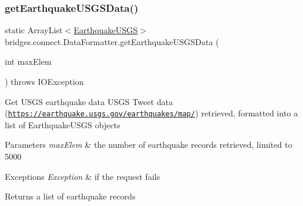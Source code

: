 \mbox{\label{classbridges_1_1connect_1_1_data_formatter_a31f1f3e398fbf7225c790dbbbde238dd}} 
\subsubsection{\texorpdfstring{get\+Earthquake\+U\+S\+G\+S\+Data()}{getEarthquakeUSGSData()}}
{\footnotesize\ttfamily static Array\+List$<$\hyperlink{classbridges_1_1data__src__dependent_1_1_earthquake_u_s_g_s}{Earthquake\+U\+S\+GS}$>$ bridges.\+connect.\+Data\+Formatter.\+get\+Earthquake\+U\+S\+G\+S\+Data (\begin{DoxyParamCaption}\item[{int}]{max\+Elem }\end{DoxyParamCaption}) throws I\+O\+Exception\hspace{0.3cm}{\ttfamily [static]}}

Get U\+S\+GS earthquake data U\+S\+GS Tweet data (\href{https://earthquake.usgs.gov/earthquakes/map/}{\tt https\+://earthquake.\+usgs.\+gov/earthquakes/map/}) retrieved, formatted into a list of Earthquake\+U\+S\+GS objects


\begin{DoxyParams}{Parameters}
{\em max\+Elem} & the number of earthquake records retrieved, limited to 5000 \\
\hline
\end{DoxyParams}

\begin{DoxyExceptions}{Exceptions}
{\em Exception} & if the request fails\\
\hline
\end{DoxyExceptions}
\begin{DoxyReturn}{Returns}
a list of earthquake records 
\end{DoxyReturn}
\mbox{\label{classbridges_1_1connect_1_1_data_formatter_a2637c733e7f4efccfb56de0940506318}} 
